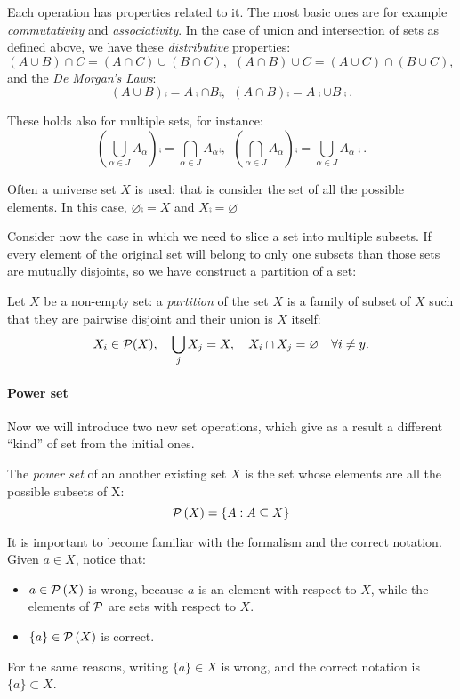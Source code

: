 Each operation has properties related to it. The most basic ones are for example \emph{commutativity} and \emph{associativity}. In the case of union and intersection of sets as defined above, we have these \emph{distributive} properties:
$$ 
	\left(A\cup B\right)\cap C 
	= \left(A\cap C\right)\cup  \left(B\cap C\right), \ \ \left(A\cap B\right)\cup C 
	= \left(A\cup C\right)\cap  \left(B\cup C\right)
,
$$
and the \emph{De Morgan's Laws}: \label{de-morgans-laws}
$$
	\left(A\cup B\right)\comp 
	= A\comp \cap B\comp, \ \ \left(A\cap B\right)\comp 
	= A\comp \cup B\comp
.
$$

These holds also for multiple sets, for instance:
$$
	\left(\bigcup_{\alpha \in J} A_\alpha\right)\comp 
	= \bigcap_{\alpha \in J} A_\alpha\comp , \ \ \left(\bigcap_{\alpha \in J} A_\alpha\right)\comp 
	= \bigcup_{\alpha \in J} A_\alpha\comp
.
$$

Often a universe set $X$ is used: that is consider the set of all the possible elements. In this case, $\varnothing\comp = X$ and $X\comp = \varnothing$

Consider now the case in which we need to slice a set into multiple subsets. If every element of the original set will belong to only one subsets than those sets are mutually disjoints, so we have construct a partition of a set:
\begin{defn}
	Let $X$ be a non-empty set: a \emph{partition} of the set $X$ is a family of subset of $X$ such that they are pairwise disjoint and their union is $X$ itself:
	$$
		X_i \in \mathcal P(X), 
		\quad \bigcup_j X_j = X, 
		\quad X_i \cap X_j = \varnothing 
		\quad \forall i \neq y
	.
	$$
\end{defn} 


\paragraph{Power set} Now we will introduce two new set operations, which give as a result a different ``kind'' of set from the initial ones.

\begin{defn}
	The \emph{power set}\footnotemark{} of an another existing set $X$ is the set whose elements are all the possible subsets of X:
	$$\mathcal P\left(X\right)=\{A : A \subseteq X\}$$
\end{defn}

It is important to become familiar with the formalism and the correct notation. Given $a\in X$, notice that:
\begin{itemize}
	\item $a \in \mathcal P\left(X\right)$ is wrong, because $a$ is an element with respect to $X$, while the elements of $\mathcal P$ are sets with respect to $X$.
	\item $\{a\} \in \mathcal P\left(X\right)$ is correct.
\end{itemize}
For the same reasons, writing $\{a\} \in X$ is wrong, and the correct notation is $\{a\} \subset X$.

